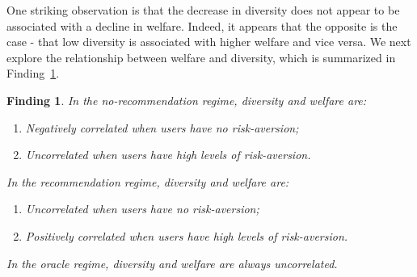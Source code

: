 \documentclass[sigconf]{acmart}
\newtheorem{finding}{Finding}
\begin{document}
One striking observation is that the decrease in diversity does not appear to be associated with a decline in welfare. Indeed, it appears that the opposite is the case - that low diversity is associated with higher welfare and vice versa. We next explore the relationship between welfare and diversity, which is summarized in Finding~\ref{finding_diversity_welfare_corr}.

\begin{finding}\label{finding_diversity_welfare_corr}
In the no-recommendation regime, diversity and welfare are:
\begin{enumerate}
\item Negatively correlated when users have no risk-aversion;
\item Uncorrelated when users have high levels of risk-aversion.
\end{enumerate}
In the recommendation regime, diversity and welfare are:
\begin{enumerate}
\item Uncorrelated when users have no risk-aversion;
\item Positively correlated when users have high levels of risk-aversion.
\end{enumerate}
In the oracle regime, diversity and welfare are always uncorrelated.
\end{finding}
\end{document}
